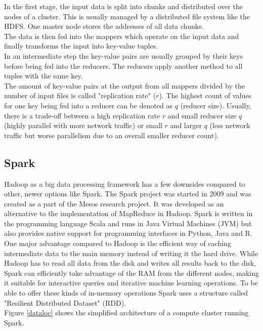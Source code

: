 \noindent In the first stage, the input data is split into chunks and distributed over the nodes of a cluster. This is usually managed by a distributed file system like the HDFS. One master node stores the addresses of all data chunks.\\
The data is then fed into the mappers which operate on the input data and finally transforms the input into key-value tuples.\\
In an intermediate step the key-value pairs are usually grouped by their keys before being fed into the reducers. The reducers apply another method to all tuples with the same key.\\
The amount of key-value pairs at the output from all mappers divided by the number of input files is called "replication rate" ($r$). The highest count of values for one key being fed into a reducer can be denoted as $q$ (reducer size). Usually, there is a trade-off between a high replication rate $r$ and small reducer size $q$ (highly parallel with more network traffic) or small $r$ and larger $q$ (less network traffic but worse parallelism due to an overall smaller reducer count).

\subsection{Spark}\label{sparksec}

Hadoop as a big data processing framework has a few downsides compared to other, newer options like Spark. The Spark project was started in 2009 and was created as a part of the Mesos research project. It was developed as an alternative to the implementation of MapReduce in Hadoop. Spark is written in the programming language Scala and runs in Java Virtual Machines (JVM) but also provides native support for programming interfaces in Python, Java and R. One major advantage compared to Hadoop is the efficient way of caching intermediate data to the main memory instead of writing it the hard drive. While Hadoop has to read all data from the disk and writes all results back to the disk, Spark can efficiently take advantage of the RAM from the different nodes, making it suitable for interactive queries and iterative machine learning operations. To be able to offer these kinds of in-memory operations Spark uses a structure called "Resilient Distributed Dataset" (RDD). \cite[p. 13]{sparkbook1}\\ 
Figure \ref{dataloc} shows the simplified architecture of a compute cluster running Spark. 

